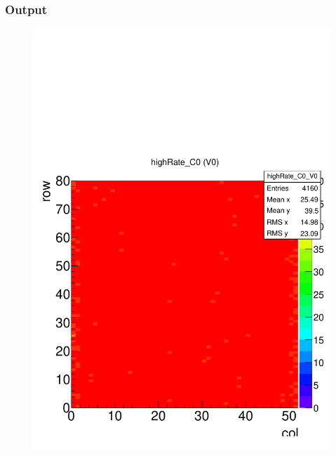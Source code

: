 \documentclass[a4paper,12pt,twoside]{article}
\begin{document}
\subsubsection{Output}
\begin{figure} [h!]
\centering
\begin{minipage}{.48\textwidth}
  \centering
  \includegraphics[width=\textwidth]{./Figures/Efficiency_Map.pdf}
  \label{Efficiency-Map}
\end{minipage}%
\hspace{2mm}
\begin{minipage}{.48\textwidth}
  \centering

\end{minipage}
\end{figure}
\end{document}
